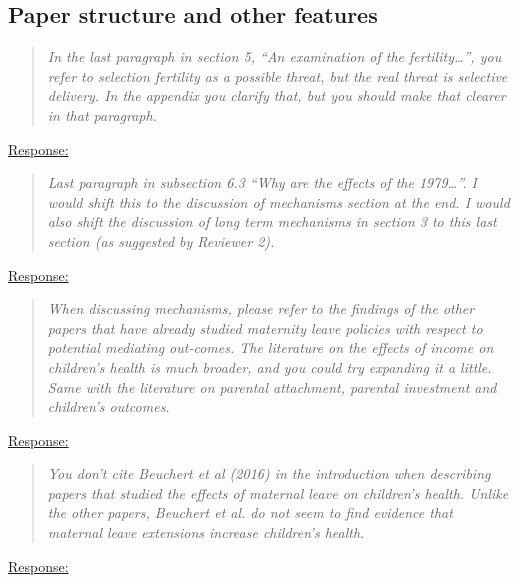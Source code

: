 \subsection*{Paper structure and other features}


% 
\begin{quote}
	\textit{In the last paragraph in section 5, “An examination of the fertility…”, you refer to selection fertility as a possible threat, but the real threat is selective delivery. In the appendix you clarify that, but you should make that clearer in that paragraph.}
\end{quote}
\underline{Response:}


% 
\begin{quote}
	\textit{Last paragraph in subsection 6.3 “Why are the effects of the 1979…”. I would shift this to the discussion of mechanisms section at the end. I would also shift the discussion of long term mechanisms in section 3 to this last section (as suggested by Reviewer 2).}
\end{quote}
\underline{Response:}



% 
\begin{quote}
	\textit{When discussing mechanisms, please refer to the findings of the other papers that have already studied maternity leave policies with respect to potential mediating out-comes. The literature on the effects of income on children’s health is much broader, and you could try expanding it a little. Same with the literature on parental attachment, parental investment and children’s outcomes.}
\end{quote}
\underline{Response:}



% 
\begin{quote}
	\textit{You don’t cite Beuchert et al (2016) in the introduction when describing papers that studied the effects of maternal leave on children’s health. Unlike the other papers, Beuchert et al. do not seem to find evidence that maternal leave extensions increase children’s health.}
\end{quote}
\underline{Response:}

